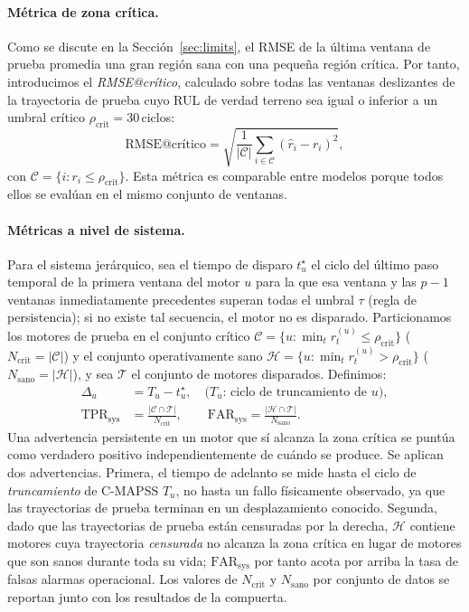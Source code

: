 \documentclass[5p,times,authoryear]{elsarticle}
\begin{document}
\paragraph{Métrica de zona crítica.} Como se discute en la Sección~\ref{sec:limits}, el RMSE de la última ventana de prueba promedia una gran región sana con una pequeña región crítica. Por tanto, introducimos el \emph{RMSE@crítico}, calculado sobre todas las ventanas deslizantes de la trayectoria de prueba cuyo RUL de verdad terreno sea igual o inferior a un umbral crítico $\rho_{\mathrm{crit}}=30$\,ciclos:
\begin{equation}
\text{RMSE@cr\'{i}tico} = \sqrt{\frac{1}{|\mathcal{C}|}\sum_{i\in\mathcal{C}}(\hat r_i-r_i)^2},
\label{eq:rmsecrit}
\end{equation}
con $\mathcal{C} = \{i:r_i\le \rho_{\mathrm{crit}}\}$. Esta métrica es comparable entre modelos porque todos ellos se evalúan en el mismo conjunto de ventanas.

\paragraph{Métricas a nivel de sistema.} Para el sistema jerárquico, sea el tiempo de disparo $t^\star_u$ el ciclo del último paso temporal de la primera ventana del motor $u$ para la que esa ventana y las $p-1$ ventanas inmediatamente precedentes superan todas el umbral $\tau$ (regla de persistencia); si no existe tal secuencia, el motor no es disparado. Particionamos los motores de prueba en el conjunto crítico $\mathcal{C}=\{u:\min_t r^{(u)}_t\le\rho_{\mathrm{crit}}\}$ ($N_{\mathrm{crit}}=|\mathcal{C}|$) y el conjunto operativamente sano $\mathcal{H}=\{u:\min_t r^{(u)}_t>\rho_{\mathrm{crit}}\}$ ($N_{\mathrm{sano}}=|\mathcal{H}|$), y sea $\mathcal{T}$ el conjunto de motores disparados. Definimos:
\begin{align}
\Delta_u &= T_u - t^\star_u, \quad\text{($T_u$: ciclo de truncamiento de $u$)},\\
\mathrm{TPR}_{\mathrm{sys}} &= \frac{|\mathcal{C}\cap\mathcal{T}|}{N_{\mathrm{crit}}}, \qquad
\mathrm{FAR}_{\mathrm{sys}} = \frac{|\mathcal{H}\cap\mathcal{T}|}{N_{\mathrm{sano}}}.
\end{align}
Una advertencia persistente en un motor que sí alcanza la zona crítica se puntúa como verdadero positivo independientemente de cuándo se produce. Se aplican dos advertencias. Primera, el tiempo de adelanto se mide hasta el ciclo de \emph{truncamiento} de C-MAPSS $T_u$, no hasta un fallo físicamente observado, ya que las trayectorias de prueba terminan en un desplazamiento conocido. Segunda, dado que las trayectorias de prueba están censuradas por la derecha, $\mathcal{H}$ contiene motores cuya trayectoria \emph{censurada} no alcanza la zona crítica en lugar de motores que son sanos durante toda su vida; $\mathrm{FAR}_{\mathrm{sys}}$ por tanto acota por arriba la tasa de falsas alarmas operacional. Los valores de $N_{\mathrm{crit}}$ y $N_{\mathrm{sano}}$ por conjunto de datos se reportan junto con los resultados de la compuerta.
\end{document}
